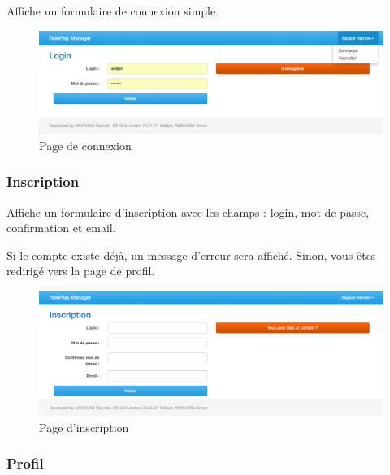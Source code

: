 \documentclass[a4paper,oneside,10pt]{article}
\begin{document}
Affiche un formulaire de connexion simple. 
\begin{figure}[H]
	\begin{center}
		\includegraphics[width=\textwidth]{images/manuel/login.png}  
		\caption{Page de connexion}
	\end{center}
\end{figure}


\subsubsection{Inscription}
\label{MUInscription}

Affiche un formulaire d'inscription avec les champs : login, mot de passe, confirmation et email. 

Si le compte existe déjà, un message d'erreur sera affiché. Sinon, vous êtes redirigé vers la page de profil. 
\begin{figure}[H]
	\begin{center}
		\includegraphics[width=\textwidth]{images/manuel/register.png}  
		\caption{Page d'inscription}
	\end{center}
\end{figure}

\subsubsection{Profil}
\label{MUProfil}
\end{document}
